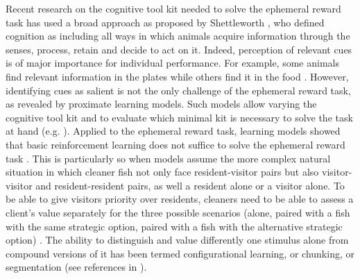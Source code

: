 \documentclass[]{rsos}%
\begin{document}
Recent research on the cognitive tool kit needed to solve the ephemeral
reward task has used a broad approach as proposed by Shettleworth
\citep{shettleworth_Cognition_2009}, who defined cognition as including
all ways in which animals acquire information
through the senses, process, retain and decide to act on it.
Indeed, perception of relevant cues is of major importance
for individual performance. For example, some animals find relevant
information in the plates \citep{wismer_Cuebased_2019} while others find
it in the food \citep{pretot_Comparative_2021, pretot_Comparing_2016}.
However, identifying cues as salient is not the only challenge
of the ephemeral reward task, as revealed by proximate learning models.
Such models allow varying the cognitive tool kit and to evaluate
which minimal kit is necessary to solve
the task at hand (e.g. \citep{dubois_Model_2021}). Applied to the ephemeral
reward task, learning models showed that basic reinforcement learning does
not suffice to solve the ephemeral reward task \citep{prat_Modelling_2022, quinones_Reinforcement_2019}.
This is particularly so when models assume the more complex natural
situation in which cleaner fish not only face resident-visitor pairs but also
visitor-visitor and resident-resident pairs, as well a resident alone or
a visitor alone. To be able to give visitors priority over residents,
cleaners need to be able to assess a client's value separately for the
three possible scenarios (alone, paired with a fish with the
same strategic option, paired with a fish with the alternative strategic option)
\citep{quinones_Reinforcement_2019}. The ability to distinguish and value differently
one stimulus alone from compound versions of it has been termed
configurational learning, or chunking,
or segmentation (see references in \citep{prat_Modelling_2022}).
\end{document}
